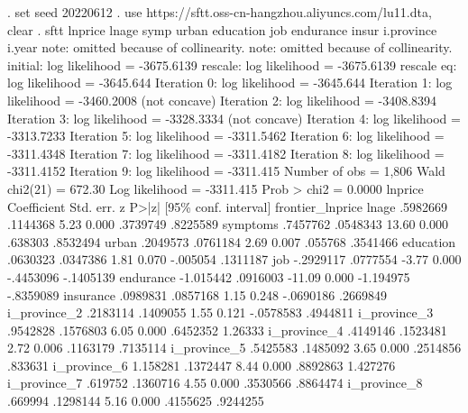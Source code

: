 . set seed 20220612
{\smallskip}
. use https://sftt.oss-cn-hangzhou.aliyuncs.com/lu11.dta, clear
{\smallskip}
. sftt lnprice lnage symp urban education job endurance insur i.province i.year
note: {} omitted because of collinearity.
note: {} omitted because of collinearity.
{\smallskip}
initial:       log likelihood = -3675.6139
rescale:       log likelihood = -3675.6139
rescale eq:    log likelihood =  -3645.644
Iteration 0:   log likelihood =  -3645.644  
Iteration 1:   log likelihood = -3460.2008  (not concave)
Iteration 2:   log likelihood = -3408.8394  
Iteration 3:   log likelihood = -3328.3334  (not concave)
Iteration 4:   log likelihood = -3313.7233  
Iteration 5:   log likelihood = -3311.5462  
Iteration 6:   log likelihood = -3311.4348  
Iteration 7:   log likelihood = -3311.4182  
Iteration 8:   log likelihood = -3311.4152  
Iteration 9:   log likelihood =  -3311.415  
{\smallskip}
{}
{\smallskip}
                                                        Number of obs =  1,806
                                                        Wald chi2(21) = 672.30
Log likelihood = -3311.415                              Prob > chi2   = 0.0000
{\smallskip}
         lnprice {\VBAR} Coefficient  Std. err.      z    P>|z|     [95\% conf. interval]
frontier_lnprice {\VBAR}
           lnage {\VBAR}   .5982669   .1144368     5.23   0.000     .3739749    .8225589
        symptoms {\VBAR}   .7457762   .0548343    13.60   0.000      .638303    .8532494
           urban {\VBAR}   .2049573   .0761184     2.69   0.007      .055768    .3541466
       education {\VBAR}   .0630323   .0347386     1.81   0.070     -.005054    .1311187
             job {\VBAR}  -.2929117   .0777554    -3.77   0.000    -.4453096   -.1405139
       endurance {\VBAR}  -1.015442   .0916003   -11.09   0.000    -1.194975   -.8359089
       insurance {\VBAR}   .0989831   .0857168     1.15   0.248    -.0690186    .2669849
    i_province_2 {\VBAR}   .2183114   .1409055     1.55   0.121    -.0578583    .4944811
    i_province_3 {\VBAR}   .9542828   .1576803     6.05   0.000     .6452352     1.26333
    i_province_4 {\VBAR}   .4149146   .1523481     2.72   0.006     .1163179    .7135114
    i_province_5 {\VBAR}   .5425583   .1485092     3.65   0.000     .2514856     .833631
    i_province_6 {\VBAR}   1.158281   .1372447     8.44   0.000     .8892863    1.427276
    i_province_7 {\VBAR}    .619752   .1360716     4.55   0.000     .3530566    .8864474
    i_province_8 {\VBAR}    .669994   .1298144     5.16   0.000     .4155625    .9244255
